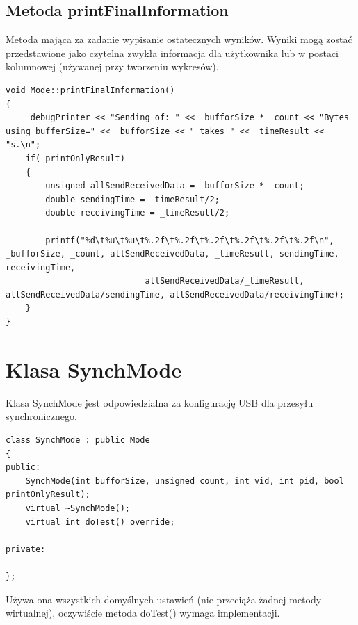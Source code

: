 \documentclass{BscUS}
\begin{document}
\subsection{Metoda printFinalInformation}
Metoda mająca za zadanie wypisanie ostatecznych wyników. Wyniki mogą zostać przedstawione jako czytelna zwykła informacja dla użytkownika lub w postaci kolumnowej (używanej przy tworzeniu wykresów).
\begin{lstlisting}[caption={Metoda Mode::printFinalInformation()},label={lst:Mode_printFinalInformation}]
void Mode::printFinalInformation()
{
	_debugPrinter << "Sending of: " << _bufforSize * _count << "Bytes using bufferSize=" << _bufforSize << " takes " << _timeResult << "s.\n";
	if(_printOnlyResult)
	{
		unsigned allSendReceivedData = _bufforSize * _count;
		double sendingTime = _timeResult/2;
		double receivingTime = _timeResult/2;

		printf("%d\t%u\t%u\t%.2f\t%.2f\t%.2f\t%.2f\t%.2f\t%.2f\n", _bufforSize, _count, allSendReceivedData, _timeResult, sendingTime, receivingTime,
							allSendReceivedData/_timeResult, allSendReceivedData/sendingTime, allSendReceivedData/receivingTime);
	}
}
\end{lstlisting}
\section{Klasa SynchMode}
Klasa SynchMode jest odpowiedzialna za konfigurację USB dla przesyłu synchronicznego. 

\begin{lstlisting}[caption={Deklaracja klasy SynchMode},label={lst:CSynchMode}]
class SynchMode : public Mode
{
public:
	SynchMode(int bufforSize, unsigned count, int vid, int pid, bool printOnlyResult);
	virtual ~SynchMode();
	virtual int doTest() override;

private:

};
\end{lstlisting}
Używa ona wszystkich domyślnych ustawień (nie przeciąża żadnej metody wirtualnej), oczywiście metoda doTest() wymaga implementacji.
\end{document}
